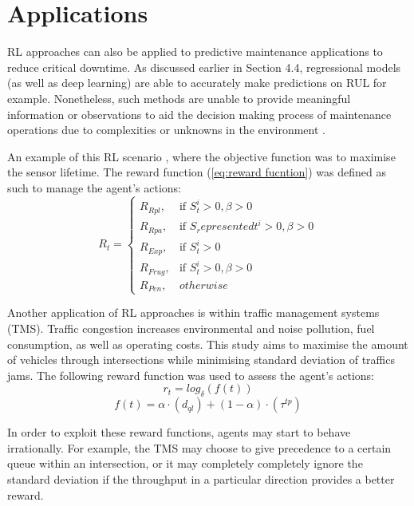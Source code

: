 \section{Applications}
RL approaches can also be applied to predictive maintenance applications to reduce critical downtime. 
As discussed earlier in Section 4.4, regressional models (as well as deep learning) are able to accurately make predictions on RUL for example. 
Nonetheless, such methods are unable to provide meaningful information or observations to aid the decision making process of maintenance operations due to complexities or unknowns in the environment \cite{9221098}.

An example of this RL scenario \cite{9221098}, where the objective function was to maximise the sensor lifetime.
The reward function (\ref{eq:reward fucntion}) was defined as such to manage the agent's actions:
\begin{equation}
    \label{eq:reward fucntion}
    R_t = \begin{cases}
        R_{Rpl}, & \text{if } S_t^i > 0, \beta > 0\\
        R_{Rpa}, & \text{if } S_representedt^i > 0, \beta > 0\\
        R_{Exp}, & \text{if } S_t^i > 0\\
        R_{Frug}, & \text{if } S_t^i > 0, \beta > 0\\
        R_{Pen}, & otherwise
    \end{cases}
\end{equation}

Another application of RL approaches is within traffic management systems (TMS). 
Traffic congestion increases environmental and noise pollution, fuel consumption, as well as operating costs.
This study \cite{JOO2020324} aims to maximise the amount of vehicles through intersections while minimising standard deviation of traffics jams.
The following reward function was used to assess the agent's actions:
\begin{equation}
    r_t = log_\delta(f(t))
\end{equation}
\begin{equation}
    f(t) = \alpha \cdot (d_{ql}) + (1 - \alpha)\cdot(\tau^{tp})
\end{equation}

In order to exploit these reward functions, agents may start to behave irrationally. 
For example, the TMS may choose to give precedence to a certain queue within an intersection, or it may completely completely ignore the standard deviation if the throughput in a particular direction provides a better reward.

